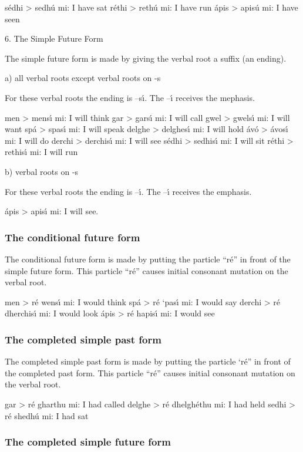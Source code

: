 s\'{e}dhi > sedh\'{u} mi: I have sat
r\'{e}thi > reth\'{u} mi: I have run
\'{a}pis > apis\'{u} mi: I have seen

6. The Simple Future Form

The simple future form is made by giving the verbal root a suffix (an ending).

a) all verbal roots except verbal roots on -s

For these verbal roots the ending is –s\'{\i}. The –\'{\i} receives the mephasis.

men > mens\'{\i} mi: I will think
gar > gars\'{\i} mi: I will call
gwel > gwels\'{\i} mi: I will want
sp\'{a} > spas\'{\i} mi: I will speak
delghe > delghes\'{\i} mi: I will hold
\'{a}v\'{o} > \'{a}vos\'{\i} mi: I will do
derchi > derchis\'{\i} mi: I will see
s\'{e}dhi > sedhis\'{\i} mi: I will sit
r\'{e}thi > rethis\'{\i} mi: I will run

b) verbal roots on -s

For these verbal roots the ending is –\'{\i}. The –\'{\i} receives the emphasis.

\'{a}pis > apis\'{\i} mi: I will see.

\subsubsection{The conditional future form}

The conditional future form is made by putting the particle “r\'{e}” in front of the simple future form. This particle “r\'{e}” causes initial consonant mutation on the verbal root.

men > r\'{e} wens\'{\i} mi: I would think
sp\'{a} > r\'{e} ‘pas\'{\i} mi: I would say
derchi > r\'{e} dherchis\'{\i} mi: I would look
\'{a}pis > r\'{e} hapis\'{\i} mi: I would see

\subsubsection{The completed simple past form}

The completed simple past form is made by putting the particle ‘r\'{e}” in front of the completed past form. This particle “r\'{e}” causes initial consonant mutation on the verbal root.

gar > r\'{e} gharthu mi: I had called
delghe > r\'{e} dhelgh\'{e}thu mi: I had held
sedhi > r\'{e} shedh\'{u} mi: I had sat

\subsubsection{The completed simple future form}

